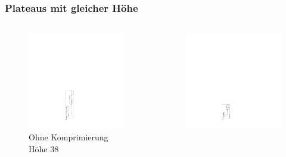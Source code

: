 \documentclass{beamer}
\begin{document}
\begin{frame}
  \frametitle{ Plateaus mit gleicher Höhe }

\begin{columns}[b]
\begin{column}{5cm}
\begin{figure}[h]
  \centering
  \includegraphics[scale=.6]{compressableGraph/isUncompressed}
  \caption{Ohne Komprimierung Höhe 38}
  \label{fig:exampleAsmoothComplex}
\end{figure}
\end{column}
\begin{column}{5cm}
\begin{figure}[h]
  \centering
  \includegraphics[scale=.6]{compressableGraph/isCompressed}

\end{figure}
\end{column}
\end{columns}
\end{frame}
\end{document}
